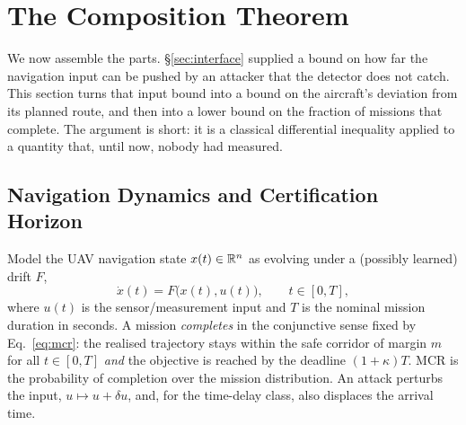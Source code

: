 \begin{table}[t]
\centering
\caption{The measured delay-to-position rate $\gamma$, from three real PX4
flights (one benign reference, one GPS-jamming, one GPS-spoofing) in the
, self-referenced to the pre-attack median. ``noise''
is the pre-attack position-error $95$th percentile; $\gamma_{\mathrm{lsq}}$ and
$\gamma_{\mathrm{peak}}$ are the least-squares and peak-secant growth rates
after attack onset. These are the  pairings.}
\label{tab:whelan}
\scriptsize
\renewcommand{\arraystretch}{1.1}

\end{table}

\section{The Composition Theorem}
\label{sec:theorem}
We now assemble the parts. \S\ref{sec:interface} supplied a bound on how far the
navigation input can be pushed by an attacker that the detector does not catch.
This section turns that input bound into a bound on the aircraft's deviation
from its planned route, and then into a lower bound on the fraction of missions
that complete. The argument is short: it is a classical differential inequality
applied to a quantity that, until now, nobody had measured.

\subsection{Navigation Dynamics and Certification Horizon}
Model the UAV navigation state $x(t)\in\mathbb{R}^n$ as evolving under a (possibly
learned) drift $F$,
\begin{equation}
\label{eq:ode}
\dot{x}(t) = F\big(x(t), u(t)\big), \qquad t\in[0,T],
\end{equation}
where $u(t)$ is the sensor/measurement input and $T$ is the nominal mission
duration in seconds. A mission \emph{completes} in the conjunctive sense fixed
by Eq.~\eqref{eq:mcr}: the realised trajectory stays within the safe corridor of
margin $m$ for all $t\in[0,T]$ \emph{and} the objective is reached by the
deadline $(1+\kappa)T$. MCR is the probability of completion over the mission
distribution. An attack perturbs the input, $u\mapsto u+\delta u$, and, for the
time-delay class, also displaces the arrival time.

